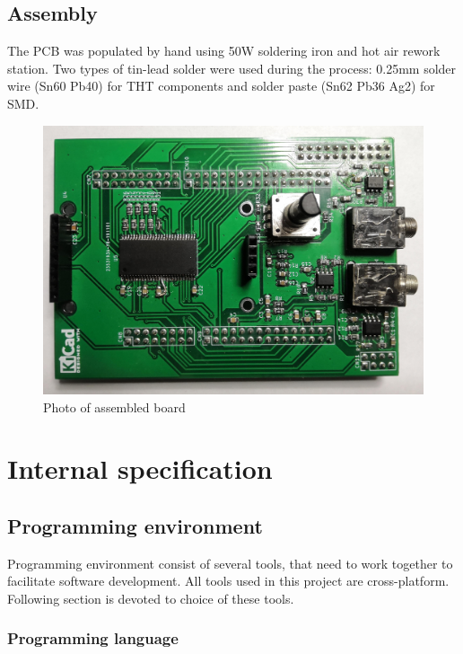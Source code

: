 \documentclass[a4paper,twoside,12pt]{book}
\begin{document}
\section{Assembly}
The PCB was populated by hand using 50W soldering iron and hot air rework station.
Two types of tin-lead solder were used during the process:
0.25mm solder wire (Sn60 Pb40) for THT components and solder paste (Sn62 Pb36 Ag2) for SMD.

\begin{figure}[H]
    \centering
    \includegraphics[width=\textwidth]{images/photo_assembled}
    \caption{Photo of assembled board}
    \label{fig:pgoto_assembled}
\end{figure}



\chapter{Internal specification}

\section{Programming environment}
Programming environment consist of several tools,
that need to work together to facilitate software development.
All tools used in this project are cross-platform.
Following section is devoted to choice of these tools.

\subsection{Programming language}
\end{document}
